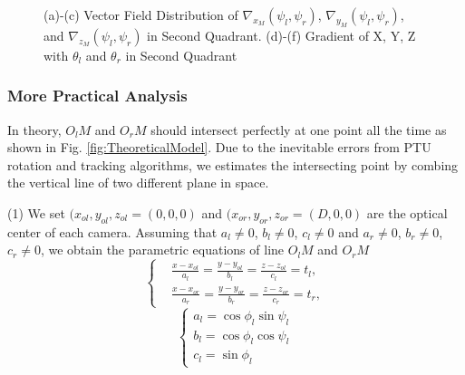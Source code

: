 \begin{figure}[!tb]
{	}	
	\caption{(a)-(c) Vector Field Distribution of $\nabla_{x_M}(\psi_l, \psi_r)$, $\nabla_{y_M}(\psi_l, \psi_r)$, and $\nabla_{z_M}(\psi_l, \psi_r)$ in Second Quadrant. (d)-(f) Gradient of X, Y, Z with $\theta_l$ and  $\theta_r$ in Second Quadrant}
\end{figure}




\subsubsection{More Practical Analysis}
In theory, $O_lM$ and $O_rM$ should intersect perfectly at one point all the time as shown in Fig. \ref{fig:TheoreticalModel}. Due to the inevitable errors from PTU rotation and tracking algorithms, we estimates the intersecting point by combing the vertical line of two different plane in space.

(1) We set $(x_{ol}, y_{ol}, z_{ol}=(0, 0, 0)$ and $(x_{or}, y_{or}, z_{or}=(D, 0, 0)$ are the optical center of each camera. Assuming that $a_l\neq0$, $b_l\neq0$, $c_l\neq0$ and $a_r\neq0$, $b_r\neq0$, $c_r\neq0$, we obtain the parametric equations of line $O_lM$ and $O_rM$ 
\begin{equation}  
\left \{
	\begin{split}
		&\frac{x-x_{ol}}{a_l} = \frac{y-y_{ol}}{b_l} = \frac{z-z_{ol}}{c_l} = t_l,\\
		&\frac{x-x_{or}}{a_r} = \frac{y-y_{or}}{b_r} = \frac{z-z_{or}}{c_r} = t_r,
	\end{split}
\right.
\end{equation}
\begin{equation}  
\left\{ 
\begin{array}{lll} 
a_l = \cos \phi_l \sin \psi_l\\
b_l = \cos \phi_l \cos \psi_l\\
c_l = \sin \phi_l
\end{array} 
\right.
\end{equation}

